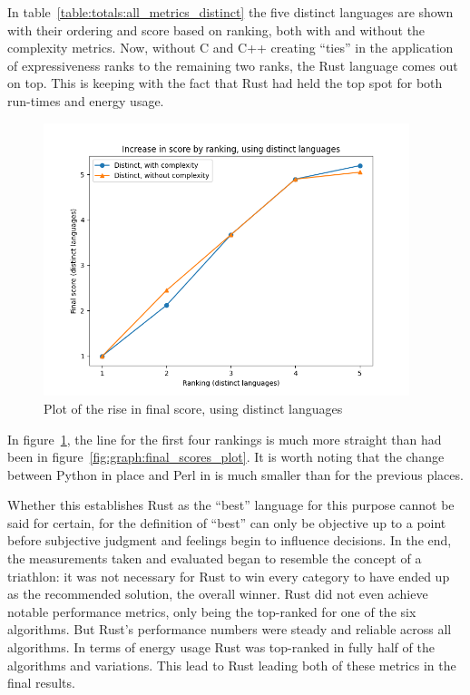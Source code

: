 In table~\ref{table:totals:all_metrics_distinct} the five distinct languages are shown with their ordering and score based on ranking, both with and without the complexity metrics. Now, without C and C++ creating ``ties'' in the application of expressiveness ranks to the remaining two ranks, the Rust language comes out on top. This is keeping with the fact that Rust had held the top spot for both run-times and energy usage.

\begin{figure}[h]
	\centering
	\includegraphics[width=0.95\textwidth]{figures/final_distinct.png}
	\caption{Plot of the rise in final score, using distinct languages}
	\label{fig:graph:final_distinct_plot}
\end{figure}

In figure~\ref{fig:graph:final_distinct_plot}, the line for the first four rankings is much more straight than had been in figure~\ref{fig:graph:final_scores_plot}. It is worth noting that the change between Python in  place and Perl in  is much smaller than for the previous places.

Whether this establishes Rust as the ``best'' language for this purpose cannot be said for certain, for the definition of ``best'' can only be objective up to a point before subjective judgment and feelings begin to influence decisions. In the end, the measurements taken and evaluated began to resemble the concept of a triathlon: it was not necessary for Rust to win every category to have ended up as the recommended solution, the overall winner. Rust did not even achieve notable performance metrics, only being the top-ranked for one of the six algorithms. But Rust's performance numbers were steady and reliable across all algorithms. In terms of energy usage Rust was top-ranked in fully half of the algorithms and variations. This lead to Rust leading both of these metrics in the final results.

